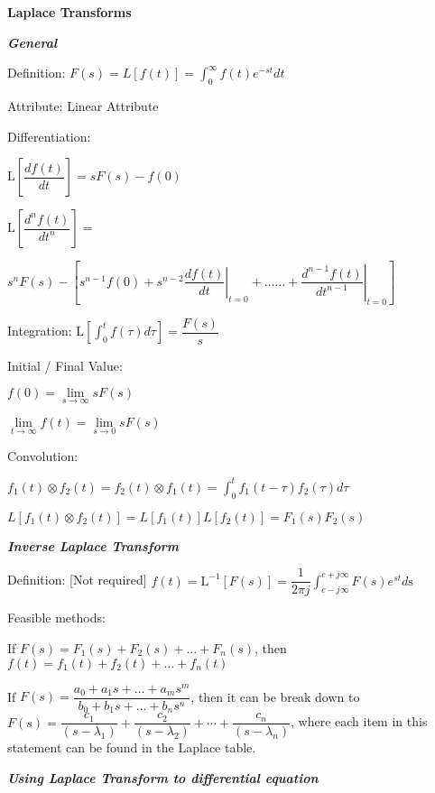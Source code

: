 \documentclass{article}
\newcommand{\bigtitle}[1]{
	\noindent
	\textbf{#1}
}
\newcommand{\smalltitle}[1]{
	\noindent
	\textbf{\textit{#1}}
}
\begin{document}
\begin{spacing}{1.2}

\twocolumn


\bigtitle{Laplace Transforms}

\smalltitle{General}

Definition: $F(s)=L[f(t)]=\int_{0}^{\infty} f(t) e^{-s t} d t$

Attribute: Linear Attribute

Differentiation: 

$\mathrm{L}\left[\dfrac{d f(t)}{d t}\right]=s F(s)-f(0)$

$\mathrm{L} \left[\dfrac{d^{n} f(t)}{d t^{n}}\right]=$

$s^{n} F(s)-\left[s^{n-1} f(0)+s^{n-2}\left.\dfrac{d f(t)}{d t}\right|_{t=0} +\ldots \ldots+\left.\dfrac{d^{n-1} f(t)}{d t^{n-1}}\right|_{t=0} \right]$

Integration: $\mathrm{L}\left[\int_{0}^{t} f(\tau) d \tau\right]=\dfrac{F(s)}{s}$

Initial / Final Value: 

$f(0)=\lim \limits_{s \rightarrow \infty} s F(s)$ 

$\lim \limits_{t \rightarrow \infty} f(t)=\lim \limits_{s \rightarrow 0} s F(s)$

Convolution: 

$f_{1}(t) \otimes f_{2}(t)=f_{2}(t) \otimes f_{1}(t)=\int_{0}^{t} f_{1}(t-\tau) f_{2}(\tau) d \tau$

$L\left[f_{1}(t) \otimes f_{2}(t)\right]=L\left[f_{1}(t)\right] L\left[f_{2}(t)\right]=F_{1}(s) F_{2}(s)$


\smalltitle{Inverse Laplace Transform}

Definition: [Not required] $f(t)=\mathrm{L}^{-1}[F(s)] =\dfrac{1}{2 \pi j} \int_{c-j \infty}^{c+j \infty} F(s) e^{s t} d \mathrm{s}$

Feasible methods:

If $F(s)=F_{1}(s)+F_{2}(s)+\ldots+F_{n}(s)$, then $f(t)=f_{1}(t)+f_{2}(t)+\ldots+f_{n}(t)$

If $F(s)=\dfrac{a_{0}+a_{1} s+\ldots+a_{m} s^{m}}{b_{0}+b_{1} s+\ldots+b_{n} s^{n}}$, then it can be break down to $F(s)=\dfrac{c_{1}}{\left(s-\lambda_{1}\right)}+\dfrac{c_{2}}{\left(s-\lambda_{2}\right)}+\cdots+\dfrac{c_{n}}{\left(s-\lambda_{n}\right)}$, where each item in this statement can be found in the Laplace table.

\smalltitle{Using Laplace Transform to differential equation}


\end{spacing}
\end{document}
